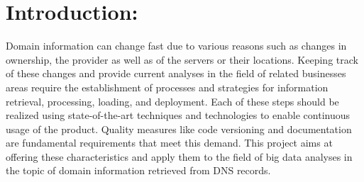 \section{Introduction:}\label{sec:introduction}
Domain information can change fast due to various reasons such as changes in ownership, the provider as well as of the servers or their locations.
Keeping track of these changes and provide current analyses in the field of related businesses areas require the establishment of processes and strategies for information retrieval, processing, loading, and deployment.
Each of these steps should be realized using state-of-the-art techniques and technologies to enable continuous usage of the product.
Quality measures like code versioning and documentation are fundamental requirements that meet this demand.
This project aims at offering these characteristics and apply them to the field of big data analyses in the topic of domain information retrieved from DNS records.